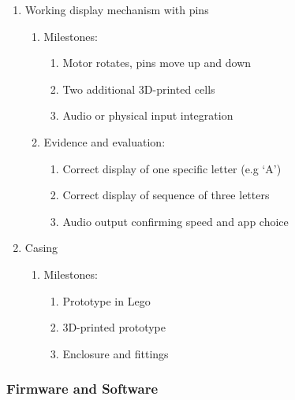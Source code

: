 \documentclass{article}
\begin{document}
\begin{enumerate}
  \item Working display mechanism with pins
  \begin{enumerate}
    \item Milestones:
    \begin{enumerate}
      \item Motor rotates, pins move up and down
      \item Two additional 3D-printed cells
      \item Audio or physical input integration
    \end{enumerate}
    \item Evidence and evaluation:
    \begin{enumerate}
      \item Correct display of one specific letter (e.g `A')
      \item Correct display of sequence of three letters
      \item Audio output confirming speed and app choice
    \end{enumerate}
  \end{enumerate}
  \item Casing
  \begin{enumerate}
    \item Milestones:
    \begin{enumerate}
      \item Prototype in Lego
      \item 3D-printed prototype
      \item Enclosure and fittings
    \end{enumerate}
  \end{enumerate}
\end{enumerate}

\subsubsection{Firmware and Software}
\end{document}
